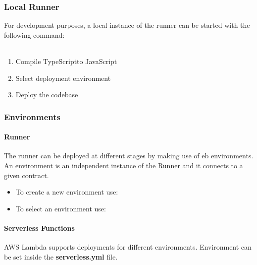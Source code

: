 \subsubsection{Local Runner}
For development purposes, a local instance of the runner can be started with the following command:\\\\\centerline{}
\begin{enumerate}
	\item Compile TypeScript\glo to JavaScript\glo \\ \centerline{}
	\item Select deployment environment \\ \centerline{}
	\item Deploy the codebase \\ \centerline{}
\end{enumerate}
\subsubsection{Environments}
\paragraph{Runner}
The runner can be deployed at different stages by making use of eb environments. An environment is an independent instance of the Runner and it connects to a given contract.
\begin{itemize}
	\item To create a new environment use:\\ \centerline{}
	\item To select an environment use:\\ \centerline{}
\end{itemize}
\paragraph{Serverless Functions}
AWS Lambda supports deployments for different environments. Environment can be set inside the \textbf{serverless.yml} file.
